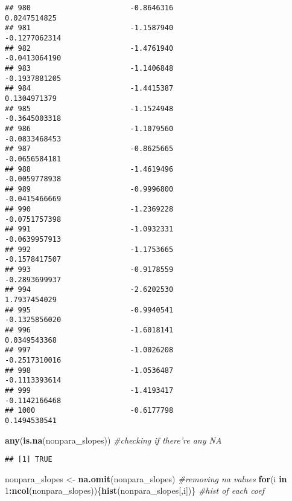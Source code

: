\documentclass[
]{article}
\newenvironment{Shaded}{\begin{snugshade}}{\end{snugshade}}
\newcommand{\CommentTok}[1]{\textcolor[rgb]{0.56,0.35,0.01}{\textit{#1}}}
\newcommand{\ControlFlowTok}[1]{\textcolor[rgb]{0.13,0.29,0.53}{\textbf{#1}}}
\newcommand{\DecValTok}[1]{\textcolor[rgb]{0.00,0.00,0.81}{#1}}
\newcommand{\KeywordTok}[1]{\textcolor[rgb]{0.13,0.29,0.53}{\textbf{#1}}}
\newcommand{\NormalTok}[1]{#1}
\newcommand{\OperatorTok}[1]{\textcolor[rgb]{0.81,0.36,0.00}{\textbf{#1}}}
\newcommand{\StringTok}[1]{\textcolor[rgb]{0.31,0.60,0.02}{#1}}
\begin{document}
\begin{verbatim}
## 980                       -0.8646316                          0.0247514825
## 981                       -1.1587940                         -0.1277062314
## 982                       -1.4761940                         -0.0413064190
## 983                       -1.1406848                         -0.1937881205
## 984                       -1.4415387                          0.1304971379
## 985                       -1.1524948                         -0.3645003318
## 986                       -1.1079560                         -0.0833468453
## 987                       -0.8625665                         -0.0656584181
## 988                       -1.4619496                         -0.0059778938
## 989                       -0.9996800                         -0.0415466669
## 990                       -1.2369228                         -0.0751757398
## 991                       -1.0932331                         -0.0639957913
## 992                       -1.1753665                         -0.1578417507
## 993                       -0.9178559                         -0.2893699937
## 994                       -2.6202530                          1.7937454029
## 995                       -0.9940541                         -0.1325856020
## 996                       -1.6018141                          0.0349543368
## 997                       -1.0026208                         -0.2517310016
## 998                       -1.0536487                         -0.1113393614
## 999                       -1.4193417                         -0.1142166468
## 1000                      -0.6177798                          0.1494530541
\end{verbatim}

\begin{Shaded}
\begin{Highlighting}[]
\KeywordTok{any}\NormalTok{(}\KeywordTok{is.na}\NormalTok{(nonpara_slopes)) }\CommentTok{#checking if there're any NA}
\end{Highlighting}
\end{Shaded}

\begin{verbatim}
## [1] TRUE
\end{verbatim}

\begin{Shaded}
\begin{Highlighting}[]
\NormalTok{nonpara_slopes <-}\StringTok{ }\KeywordTok{na.omit}\NormalTok{(nonpara_slopes) }\CommentTok{#removing na values}
\ControlFlowTok{for}\NormalTok{(i }\ControlFlowTok{in} \DecValTok{1}\OperatorTok{:}\KeywordTok{ncol}\NormalTok{(nonpara_slopes))\{}\KeywordTok{hist}\NormalTok{(nonpara_slopes[,i])\} }\CommentTok{#hist of each coef}
\end{Highlighting}
\end{Shaded}
\end{document}
